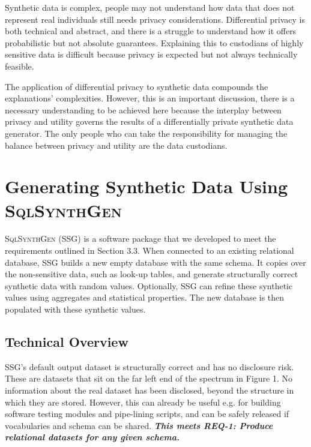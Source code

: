 \documentclass[11pt]{article}
\begin{document}
Synthetic data is complex, people may not understand how data that does not represent real individuals still needs privacy considerations. Differential privacy is both technical and abstract, and there is a struggle to understand how it offers probabilistic but not absolute guarantees. Explaining this to custodians of highly sensitive data is difficult because privacy is expected but not always technically feasible.


The application of differential privacy to synthetic data compounds the explanations' complexities. However, this is an important discussion, there is a necessary understanding to be achieved here because the interplay between privacy and utility governs the results of a differentially private synthetic data generator. The only people who can take the responsibility for managing the balance between privacy and utility are the data custodians.

 
\section{Generating Synthetic Data Using \textsc{SqlSynthGen}}

\textsc{SqlSynthGen} (SSG) is a software package that we developed to meet the requirements outlined in Section 3.3. When connected to an existing relational database, SSG builds a new empty database with the same schema. It copies over the non-sensitive data, such as look-up tables, and generate structurally correct synthetic data with random values. Optionally, SSG can refine these synthetic values using aggregates and statistical properties. The new database is then populated with these synthetic values.  

\subsection{Technical Overview}

SSG's default output dataset is structurally correct and has no disclosure risk. These are datasets that sit on the far left end of the spectrum in Figure 1. No information about the real dataset has been disclosed, beyond the structure in which they are stored. However, this can already be useful e.g. for building software testing modules and pipe-lining scripts, and can be safely released if vocabularies and schema can be shared. \textbf{\textit{This meets REQ-1: Produce relational datasets for any given schema.}}
\end{document}
